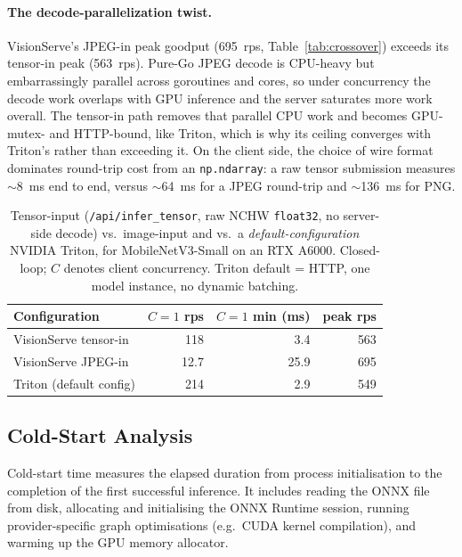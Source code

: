 \paragraph{The decode-parallelization twist.}
VisionServe's JPEG-in peak goodput (695~rps,
Table~\ref{tab:crossover}) exceeds its tensor-in peak (563~rps).  Pure-Go JPEG decode is CPU-heavy but
embarrassingly parallel across goroutines and cores, so under concurrency the decode
work overlaps with GPU inference and the server saturates more work overall.  The
tensor-in path removes that parallel CPU work and becomes GPU-mutex- and HTTP-bound,
like Triton, which is why its ceiling converges with Triton's rather
than exceeding it.  On the client side, the choice of wire format dominates round-trip
cost from an \texttt{np.ndarray}: a raw tensor submission measures $\sim$8~ms end to end,
versus $\sim$64~ms for a JPEG round-trip and $\sim$136~ms for PNG.

\begin{table}[t]
  \centering
  \small
  \caption{%
    Tensor-input (\texttt{/api/infer\_tensor}, raw NCHW \texttt{float32}, no
    server-side decode) vs.\ image-input and vs.\ a \emph{default-configuration}
    NVIDIA Triton, for MobileNetV3-Small on an RTX A6000.  Closed-loop;
    $C$ denotes client concurrency.  Triton default = HTTP, one model instance,
    no dynamic batching.%
  }
  \label{tab:tensorin}
  \begin{tabular}{lrrr}
    \toprule
    \textbf{Configuration} & \textbf{$C{=}1$ rps} & \textbf{$C{=}1$ min (ms)}
      & \textbf{peak rps} \\
    \midrule
    VisionServe tensor-in   & 118  & 3.4  & 563 \\
    VisionServe JPEG-in     & 12.7 & 25.9 & 695 \\
    Triton (default config) & 214  & 2.9  & 549 \\
    \bottomrule
  \end{tabular}
\end{table}

\subsection{Cold-Start Analysis}
\label{sec:eval:coldstart}

Cold-start time measures the elapsed duration from process initialisation to the
completion of the first successful inference.  It includes reading the ONNX file from
disk, allocating and initialising the ONNX Runtime session, running provider-specific
graph optimisations (e.g.\ CUDA kernel compilation), and warming up the GPU memory
allocator.

